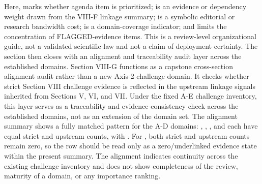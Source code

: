 {}Here,  marks whether agenda item  is prioritized;  is an evidence or dependency weight drawn from the VIII-F linkage summary;  is a symbolic editorial or research bandwidth cost;  is a domain-coverage indicator; and  limits the concentration of FLAGGED-evidence items. This is a review-level organizational guide, not a validated scientific law and not a claim of deployment certainty.\markdownRendererParagraphSeparator
{}The section then closes with an alignment and traceability audit layer across the established domains.\markdownRendererInterblockSeparator
{}
\markdownRendererSectionEnd 
\markdownRendererSectionEnd \markdownRendererSectionBegin
{}\markdownRendererInterblockSeparator
{}Section VIII-G functions as a capstone cross-section alignment audit rather than a new Axis-2 challenge domain. It checks whether strict Section VIII challenge evidence is reflected in the upstream linkage signals inherited from Sections V, VI, and VII. Under the fixed A-E challenge inventory, this layer serves as a traceability and evidence-consistency check across the established domains, not as an extension of the domain set.\markdownRendererParagraphSeparator
{}The alignment summary shows a fully matched pattern for the A-D domains: , , , and  each have equal strict and upstream counts, with . For , both strict and upstream counts remain zero, so the row should be read only as a zero/underlinked evidence state within the present summary. The alignment indicates continuity across the existing challenge inventory and does not show completeness of the review, maturity of a domain, or any importance ranking.\markdownRendererParagraphSeparator
